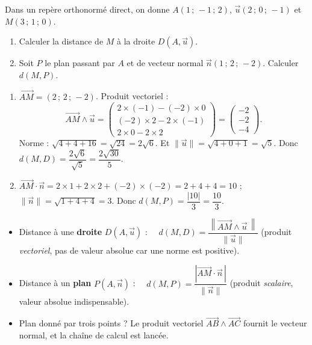 \documentclass[11pt]{article}
\begin{document}
\begin{exercice}
Dans un repère orthonormé direct, on donne $A(1\,;\,-1\,;\,2)$, $\vec{u}(2\,;\,0\,;\,-1)$ et $M(3\,;\,1\,;\,0)$.
\begin{enumerate}
\item Calculer la distance de $M$ à la droite $D(A, \vec{u})$.
\item Soit $P$ le plan passant par $A$ et de vecteur normal $\vec{n}(1\,;\,2\,;\,-2)$. Calculer $d(M, P)$.
\end{enumerate}
\end{exercice}

\begin{corrige}[Exercice]
\begin{enumerate}
\item $\overrightarrow{AM} = (2\,;\,2\,;\,-2)$. Produit vectoriel :
\[ \overrightarrow{AM} \wedge \vec{u} = \begin{pmatrix} 2 \times (-1) - (-2) \times 0 \\ (-2) \times 2 - 2 \times (-1) \\ 2 \times 0 - 2 \times 2 \end{pmatrix} = \begin{pmatrix} -2 \\ -2 \\ -4 \end{pmatrix}. \]
Norme : $\sqrt{4+4+16} = \sqrt{24} = 2\sqrt{6}$. Et $\|\vec{u}\| = \sqrt{4+0+1} = \sqrt{5}$. Donc $d(M, D) = \dfrac{2\sqrt{6}}{\sqrt{5}} = \dfrac{2\sqrt{30}}{5}$.
\item $\overrightarrow{AM} \cdot \vec{n} = 2 \times 1 + 2 \times 2 + (-2) \times (-2) = 2 + 4 + 4 = 10$ ; $\|\vec{n}\| = \sqrt{1+4+4} = 3$. Donc $d(M, P) = \dfrac{|10|}{3} = \dfrac{10}{3}$.
\end{enumerate}
\end{corrige}

\begin{aretenir}
\begin{itemize}
\item Distance à une \textbf{droite} $D(A, \vec{u})$ : $\quad d(M, D) = \dfrac{\left\|\overrightarrow{AM} \wedge \vec{u}\,\right\|}{\|\vec{u}\|}$ \quad (produit \emph{vectoriel}, pas de valeur absolue car une norme est positive).
\item Distance à un \textbf{plan} $P(A, \vec{n})$ : $\quad d(M, P) = \dfrac{\left|\overrightarrow{AM} \cdot \vec{n}\,\right|}{\|\vec{n}\|}$ \quad (produit \emph{scalaire}, valeur absolue indispensable).
\item Plan donné par trois points ? Le produit vectoriel $\overrightarrow{AB} \wedge \overrightarrow{AC}$ fournit le vecteur normal, et la chaîne de calcul est lancée.
\end{itemize}
\end{aretenir}
\end{document}
